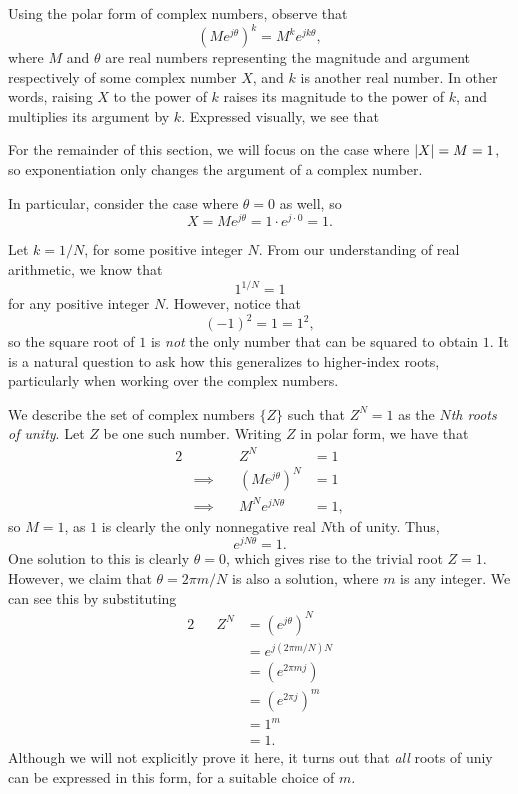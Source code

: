 \documentclass[letterpaper]{article}
\theoremstyle{remark}
\newcommand{\eqn}[1]{\begin{alignat*}{2}#1\end{alignat*}}
\newcommand*{\thus}{&\implies\quad&}
\begin{document}
Using the polar form of complex numbers, observe that
\[
    (Me^{j\theta})^k = M^k e^{jk\theta},
\]
where $M$ and $\theta$ are real numbers representing the magnitude and argument respectively of some complex number $X$, and $k$ is another real number. In other words, raising $X$ to the power of $k$ raises its magnitude to the power of $k$, and multiplies its argument by $k$. Expressed visually, we see that
\begin{center}
\end{center}

For the remainder of this section, we will focus on the case where $\abs{X} = M = 1$, so exponentiation only changes the argument of a complex number.

In particular, consider the case where $\theta = 0$ as well, so
\[
    X = Me^{j\theta} = 1 \cdot e^{j \cdot 0} = 1.
\]

Let $k = 1 / N$, for some positive integer $N$. From our understanding of real arithmetic, we know that
\[
    1^{1/N} = 1
\]
for any positive integer $N$. However, notice that
\[
    (-1)^2 = 1 = 1^2,
\]
so the square root of $1$ is \emph{not} the only number that can be squared to obtain $1$. It is a natural question to ask how this generalizes to higher-index roots, particularly when working over the complex numbers.

We describe the set of complex numbers $\{ Z \}$ such that $Z^N = 1$ as the \emph{$N$th roots of unity}. Let $Z$ be one such number. Writing $Z$ in polar form, we have that
\eqn{
    && Z^N &= 1 \\
    \thus (Me^{j\theta})^N &= 1 \\
    \thus M^N e^{jN\theta} &= 1,
}
so $M = 1$, as $1$ is clearly the only nonnegative real $N$th of unity. Thus,
\[
    e^{jN\theta} = 1.
\]
One solution to this is clearly $\theta = 0$, which gives rise to the trivial root $Z = 1$. However, we claim that $\theta = 2\pi m / N$ is also a solution, where $m$ is any integer. We can see this by substituting
\eqn{
    && Z^N &= (e^{j\theta})^N \\
    &&&= e^{j(2\pi m / N) N} \\
    &&&= (e^{2 \pi m j}) \\
    &&&= (e^{2 \pi j})^m \\
    &&&= 1^m \\
    &&&= 1.
}
Although we will not explicitly prove it here, it turns out that \emph{all} roots of uniy can be expressed in this form, for a suitable choice of $m$.
\end{document}
